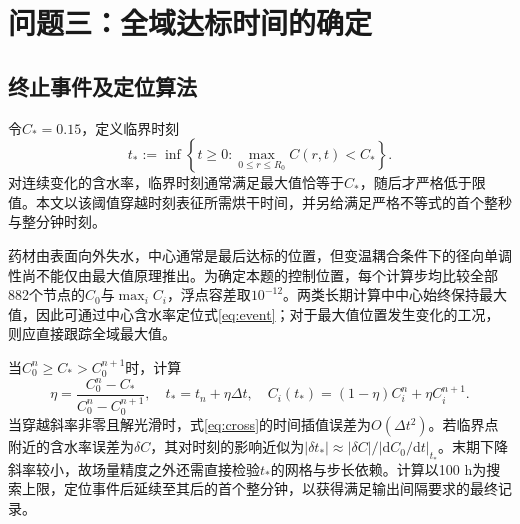 \section{问题三：全域达标时间的确定}
\subsection{终止事件及定位算法}
令$C_*=0.15$\cunit，定义临界时刻
\begin{equation}
t_*:=\inf\left\{t\ge0:\max_{0\le r\le R_0}C(r,t)<C_*\right\}.
\label{eq:event}
\end{equation}
对连续变化的含水率，临界时刻通常满足最大值恰等于$C_*$，随后才严格低于限值。本文以该阈值穿越时刻表征所需烘干时间，并另给满足严格不等式的首个整秒与整分钟时刻。

药材由表面向外失水，中心通常是最后达标的位置，但变温耦合条件下的径向单调性尚不能仅由最大值原理推出。为确定本题的控制位置，每个计算步均比较全部882个节点的$C_0$与$\max_i C_i$，浮点容差取$10^{-12}$。两类长期计算中中心始终保持最大值，因此可通过中心含水率定位式\eqref{eq:event}；对于最大值位置发生变化的工况，则应直接跟踪全域最大值。

当$C_0^n\ge C_*>C_0^{n+1}$时，计算
\begin{equation}
\eta=\frac{C_0^n-C_*}{C_0^n-C_0^{n+1}},\quad
t_*=t_n+\eta\Delta t,\quad
C_i(t_*)=(1-\eta)C_i^n+\eta C_i^{n+1}.
\label{eq:cross}
\end{equation}
当穿越斜率非零且解光滑时，式\eqref{eq:cross}的时间插值误差为$O(\Delta t^2)$。若临界点附近的含水率误差为$\delta C$，其对时刻的影响近似为$|\delta t_*|\approx|\delta C|/|\mathrm d C_0/\mathrm dt|_{t_*}$。末期下降斜率较小，故场量精度之外还需直接检验$t_*$的网格与步长依赖。计算以100 h为搜索上限，定位事件后延续至其后的首个整分钟，以获得满足输出间隔要求的最终记录。

